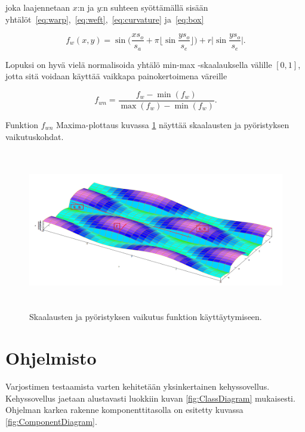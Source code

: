 \documentclass[utf8,bachelor]{gradu3}
\begin{document}
joka laajennetaan $x$:n ja $y$:n suhteen syöttämällä sisään yhtälöt~\eqref{eq:warp},~\eqref{eq:weft},~\eqref{eq:curvature} ja~\eqref{eq:box}

\begin{equation}
\label{eq:weave_xy}
f_w(x,y) = \sin{\big(\frac{xs_o}{s_a} + \pi \lfloor \sin{\frac{ys_o}{s_e}} \rfloor\big)} + r\lvert\sin{\frac{ys_o}{s_e}}\rvert.
\end{equation}

Lopuksi on hyvä vielä normalisoida yhtälö min-max -skaalauksella välille $\left[0,1\right]$, jotta sitä voidaan käyttää vaikkapa painokertoimena väreille

\begin{equation}
\label{eq:weave_norm}
f_{wn} = \frac{f_w-\min{(f_w)}}{\max{(f_w)}-\min{(f_w)}}.
\end{equation}

Funktion $f_{wn}$ Maxima-plottaus kuvassa \ref{fig:maxima_scale} näyttää skaalausten ja pyöristyksen vaikutuskohdat. 

\begin{figure}[h] 
	\centering
	\includegraphics[height=7cm]{weave_plot_scales_maxima_small.png}
	\caption{Skaalausten ja pyöristyksen vaikutus funktion käyttäytymiseen.}
	\label{fig:maxima_scale}
\end{figure}

\chapter{Ohjelmisto}

Varjostimen testaamista varten kehitetään yksinkertainen kehyssovellus. Kehyssovellus jaetaan alustavasti luokkiin kuvan \ref{fig:ClassDiagram} mukaisesti. Ohjelman karkea rakenne komponenttitasolla on esitetty kuvassa \ref{fig:ComponentDiagram}.
\end{document}
